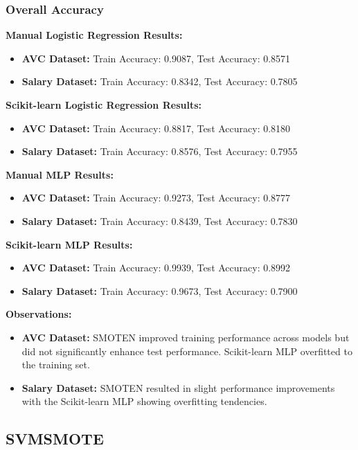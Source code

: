 \documentclass[a4paper,12pt]{article}
\begin{document}
\subsubsection{Overall Accuracy}

\textbf{Manual Logistic Regression Results:}
\begin{itemize}
    \item \textbf{AVC Dataset:} Train Accuracy: 0.9087, Test Accuracy: 0.8571
    \item \textbf{Salary Dataset:} Train Accuracy: 0.8342, Test Accuracy: 0.7805
\end{itemize}

\textbf{Scikit-learn Logistic Regression Results:}
\begin{itemize}
    \item \textbf{AVC Dataset:} Train Accuracy: 0.8817, Test Accuracy: 0.8180
    \item \textbf{Salary Dataset:} Train Accuracy: 0.8576, Test Accuracy: 0.7955
\end{itemize}

\textbf{Manual MLP Results:}
\begin{itemize}
    \item \textbf{AVC Dataset:} Train Accuracy: 0.9273, Test Accuracy: 0.8777
    \item \textbf{Salary Dataset:} Train Accuracy: 0.8439, Test Accuracy: 0.7830
\end{itemize}

\textbf{Scikit-learn MLP Results:}
\begin{itemize}
    \item \textbf{AVC Dataset:} Train Accuracy: 0.9939, Test Accuracy: 0.8992
    \item \textbf{Salary Dataset:} Train Accuracy: 0.9673, Test Accuracy: 0.7900
\end{itemize}

\textbf{Observations:}
\begin{itemize}
    \item \textbf{AVC Dataset:} SMOTEN improved training performance across models but did not significantly enhance test performance. Scikit-learn MLP overfitted to the training set.
    \item \textbf{Salary Dataset:} SMOTEN resulted in slight performance improvements with the Scikit-learn MLP showing overfitting tendencies.
\end{itemize}

\subsection{SVMSMOTE}
\end{document}
